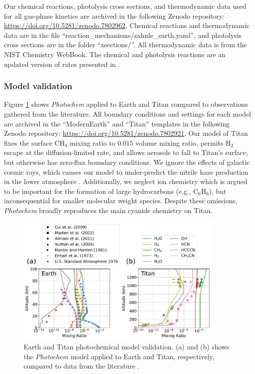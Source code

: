 Our chemical reactions, photolysis cross sections, and thermodynamic data used for all gas-phase kinetics are archived in the following Zenodo repository: \url{https://doi.org/10.5281/zenodo.7802962}. Chemical reactions and thermodynamic data are in the file ``reaction\_mechanisms/zahnle\_earth.yaml'', and photolysis cross sections are in the folder ``xsections/''. All thermodynamic data is from the NIST Chemistry WebBook. The chemical and photolysis reactions are an updated version of rates presented in \citet{Zahnle_2016}.

\subsubsection{Model validation} \label{sec:clima_model_validation}

Figure \ref{fig:earth_titan_valid} shows \emph{Photochem} applied to Earth and Titan compared to observations gathered from the literature. All boundary conditions and settings for each model are archived in the ``ModernEarth'' and ``Titan'' templates in the following Zenodo repository: \url{https://doi.org/10.5281/zenodo.7802921}. Our model of Titan fixes the surface CH$_4$ mixing ratio to $0.015$ volume mixing ratio, permits H$_2$ escape at the diffusion-limited rate, and allows aerosols to fall to Titan's surface, but otherwise has zero-flux boundary conditions. We ignore the effects of galactic cosmic rays, which causes our model to under-predict the nitrile haze production in the lower atmosphere \citep{Lavvas_2008b}. Additionally, we neglect ion chemistry which is argued to be important for the formation of large hydrocarbons (e.g., $\mathrm{C_6H_6}$), but inconsequential for smaller molecular weight species. Despite these omissions, \emph{Photochem} broadly reproduces the main cyanide chemistry on Titan.

\begin{figure}
  \centering
  \includegraphics[width=0.9\textwidth]{tex/5impacts/figures/supplement/Earth_Titan_validation.pdf}
  \caption{Earth and Titan photochemical model validation. (a) and (b) shows the \emph{Photochem} model applied to Earth and Titan, respectively, compared to data from the literature \citep{Cui_2009,Marten_2002,Adriani_2011,Vuitton_2006,Massie_1981,Ehhalt_1975}.}
  \label{fig:earth_titan_valid}
\end{figure}

